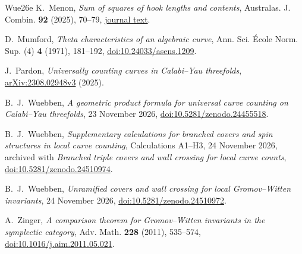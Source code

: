 \begin{thebibliography}{Wue26e}
 K.~Menon,
\emph{Sum of squares of hook lengths and contents}, Australas. J. Combin.
\textbf{92} (2025), 70--79,
\href{https://ajc.maths.uq.edu.au/pdf/92/ajc_v92_p070.pdf}{journal text}.

 D.~Mumford,
\emph{Theta characteristics of an algebraic curve}, Ann. Sci. \'Ecole
Norm. Sup. (4) \textbf{4} (1971), 181--192,
\href{https://doi.org/10.24033/asens.1209}{doi:10.24033/asens.1209}.

 J.~Pardon,
\emph{Universally counting curves in Calabi--Yau threefolds},
\href{https://arxiv.org/abs/2308.02948v3}{arXiv:2308.02948v3} (2025).

 B.~J.~Wuebben,
\emph{A geometric product formula for universal curve counting on Calabi--Yau threefolds}, 23 November 2026,
\href{https://doi.org/10.5281/zenodo.24455518}{doi:10.5281/zenodo.24455518}.

 B.~J.~Wuebben,
\emph{Supplementary calculations for branched covers and spin structures in local curve counting}, Calculations A1--H3, 24 November 2026, archived with \emph{Branched triple covers and wall crossing for local curve counts},
\href{https://doi.org/10.5281/zenodo.24510974}{doi:10.5281/zenodo.24510974}.

 B.~J.~Wuebben,
\emph{Unramified covers and wall crossing for local Gromov--Witten invariants}, 24 November 2026,
\href{https://doi.org/10.5281/zenodo.24510972}{doi:10.5281/zenodo.24510972}.

 A.~Zinger,
\emph{A comparison theorem for Gromov--Witten invariants in the
symplectic category}, Adv. Math. \textbf{228} (2011), 535--574,
\href{https://doi.org/10.1016/j.aim.2011.05.021}{doi:10.1016/j.aim.2011.05.021}.
\end{thebibliography}
